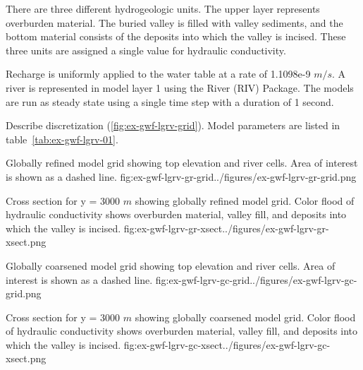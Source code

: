 There are three different hydrogeologic units.  The upper layer represents overburden material.  The buried valley is filled with valley sediments, and the bottom material consists of the deposits into which the valley is incised.  These three units are assigned a single value for hydraulic conductivity.

Recharge is uniformly applied to the water table at a rate of 1.1098e-9 $m/s$.  A river is represented in model layer 1 using the River (RIV) Package.  The models are run as steady state using a single time step with a duration of 1 second. 

Describe discretization (\ref{fig:ex-gwf-lgrv-grid}).  Model parameters are listed in table~\ref{tab:ex-gwf-lgrv-01}. 





\begin{StandardFigure}{
                                     Globally refined model grid showing top elevation and river cells.  Area of interest is shown as a dashed line.
                                     }{fig:ex-gwf-lgrv-gr-grid}{../figures/ex-gwf-lgrv-gr-grid.png}
\end{StandardFigure}                                 

\begin{StandardFigure}{
                                     Cross section for y = 3000 $m$ showing globally refined model grid.  Color flood of hydraulic conductivity shows overburden material, valley fill, and deposits into which the valley is incised.
                                     }{fig:ex-gwf-lgrv-gr-xsect}{../figures/ex-gwf-lgrv-gr-xsect.png}
\end{StandardFigure}                                 

\begin{StandardFigure}{
                                     Globally coarsened model grid showing top elevation and river cells.  Area of interest is shown as a dashed line.
                                     }{fig:ex-gwf-lgrv-gc-grid}{../figures/ex-gwf-lgrv-gc-grid.png}
\end{StandardFigure}                                 

\begin{StandardFigure}{
                                     Cross section for y = 3000 $m$ showing globally coarsened model grid.  Color flood of hydraulic conductivity shows overburden material, valley fill, and deposits into which the valley is incised.
                                     }{fig:ex-gwf-lgrv-gc-xsect}{../figures/ex-gwf-lgrv-gc-xsect.png}
\end{StandardFigure}                                 



